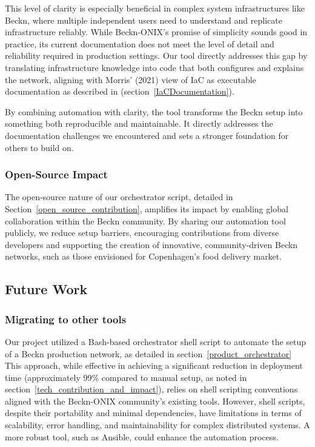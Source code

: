 This level of clarity is especially beneficial in complex system infrastructures like Beckn, where multiple independent users need to understand and replicate infrastructure reliably. While Beckn-ONIX’s promise of simplicity sounds good in practice, its current documentation does not meet the level of detail and reliability required in production settings. Our tool directly addresses this gap by translating infrastructure knowledge into code that both configures and explains the network, aligning with Morris' (2021) view of IaC as executable documentation as described in (section~\ref{IaCDocumentation}).

By combining automation with clarity, the tool transforms the Beckn setup into something both reproducible and maintainable. It directly addresses the documentation challenges we encountered and sets a stronger foundation for others to build on.

\subsubsection{Open-Source Impact}
The open-source nature of our orchestrator script, detailed in Section~\ref{open_source_contribution}, amplifies its impact by enabling global collaboration within the Beckn community. By sharing our automation tool publicly, we reduce setup barriers, encouraging contributions from diverse developers and supporting the creation of innovative, community-driven Beckn networks, such as those envisioned for Copenhagen’s food delivery market.

\subsection{Future Work}
\subsubsection{Migrating to other tools}
Our project utilized a Bash-based orchestrator shell script to automate the setup of a Beckn production network, as detailed in section~\ref{product_orchestrator} This approach, while effective in achieving a significant reduction in deployment time (approximately 99\% compared to manual setup, as noted in section~\ref{tech_contribution_and_impact}), relies on shell scripting conventions aligned with the Beckn-ONIX community's existing tools. However, shell scripts, despite their portability and minimal dependencies, have limitations in terms of scalability, error handling, and maintainability for complex distributed systems. A more robust tool, such as Ansible, could enhance the automation process.

